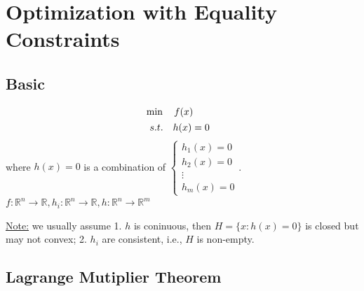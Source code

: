 \documentclass[11pt,a4paper]{article}
\begin{document}
\section{Optimization with Equality Constraints}
\subsection{Basic}
\begin{align*}
    &\min\quad f(x)\\
    &\begin{array}{r@{\quad}r@{}l@{\quad}l}
    s.t.
    &h(x)=0&\\
\end{array}
\end{align*}
where $h(x)=0$ is a combination of $\left\{\begin{matrix}
    h_1(x)=0\\
    h_2(x)=0\\
    \vdots\\
    h_m(x)=0
\end{matrix}\right.$. $f:\mathbb{R}^n \rightarrow \mathbb{R}, h_i:\mathbb{R}^n \rightarrow \mathbb{R}, h:\mathbb{R}^n \rightarrow \mathbb{R}^m$

\underline{Note:} we usually assume 1. $h$ is coninuous, then $H=\{x:h(x)=0\}$ is closed but may not convex; 2. $h_i$ are consistent, i.e., $H$ is non-empty.

\subsection{Lagrange Mutiplier Theorem}
\end{document}
